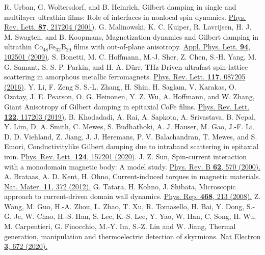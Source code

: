 \documentclass[prl,aps,twocolumn,showpacs,citeautoscript,reprint,superscriptaddress]{revtex4-1}
\newcommand{\DOI}[1]{\href{https://doi.org/#1}}
\begin{document}
\begin{thebibliography}{00}
R. Urban, G. Woltersdorf, and B. Heinrich, Gilbert damping in single and multilayer ultrathin films: Role of interfaces in nonlocal spin dynamics. \DOI{10.1103/PhysRevLett.87.217204}{Phys. Rev. Lett. {\bf 87}, 217204 (2001)}.
G. Malinowski, K. C. Kuiper, R. Lavrijsen, H. J. M. Swagten, and B. Koopmans, Magnetization dynamics and Gilbert damping in ultrathin Co$_{48}$Fe$_{32}$B$_{20}$ films with out-of-plane anisotropy. \DOI{10.1063/1.3093816}{Appl. Phys. Lett. {\bf 94}, 102501 (2009)}.
S. Bonetti, M. C. Hoffmann, M.-J. Sher, Z. Chen, S.-H. Yang, M. G. Samant, S. S. P. Parkin, and H. A. D{\"u}rr, THz-Driven ultrafast spin-lattice scattering in amorphous metallic ferromagnets. \DOI{10.1103/PhysRevLett.117.087205}{Phys. Rev. Lett. {\bf 117}, 087205 (2016)}.
Y. Li, F. Zeng S. S.-L. Zhang, H. Shin, H. Saglam, V. Karakas, O. Ozatay, J. E. Pearson, O. G. Heinonen, Y. Z. Wu, A. Hoffmann, and W. Zhang, Giant Anisotropy of Gilbert damping in epitaxial CoFe films. \DOI{10.1103/PhysRevLett.122.117203}{Phys. Rev. Lett. {\bf 122}, 117203 (2019)}.
B. Khodadadi, A. Rai, A. Sapkota, A. Srivastava, B. Nepal, Y. Lim, D. A. Smith, C. Mewes, S. Budhathoki, A. J. Hauser, M. Gao, J.-F. Li, D. D. Viehland, Z. Jiang, J. J. Heremans, P. V. Balachandran, T. Mewes, and S. Emori, Conductivitylike Gilbert damping due to intraband scattering in epitaxial iron. \DOI{10.1103/PhysRevLett.124.157201}{Phys. Rev. Lett. {\bf 124}, 157201 (2020)}.
J. Z. Sun, Spin-current interaction with a monodomain magnetic body: A model study. \DOI{10.1103/PhysRevB.62.570}{Phys. Rev. B {\bf 62}, 570 (2000).}
A. Brataas, A. D. Kent, H. Ohno, Current-induced torques in magnetic materials. \DOI{10.1038/NMAT3311}{Nat. Mater. {\bf 11}, 372 (2012).}
G. Tatara, H. Kohno, J. Shibata, Microscopic approach to current-driven domain wall dynamics. \DOI{10.1016/j.physrep.2008.07.003}{Phys. Rep. {\bf 468}, 213 (2008).}
Z. Wang, M. Guo, H.-A. Zhou, L. Zhao, T. Xu, R. Tomasello, H. Bai, Y. Dong, S.-G. Je, W. Chao, H.-S. Han, S. Lee, K.-S. Lee, Y. Yao, W. Han, C. Song, H. Wu, M. Carpentieri, G. Finocchio, M.-Y. Im, S.-Z. Lin and W. Jiang, Thermal generation, manipulation and thermoelectric detection of skyrmions. \DOI{10.1038/s41928-020-00489-2}{Nat Electron {\bf 3}, 672 (2020).}

\end{thebibliography}
\end{document}
